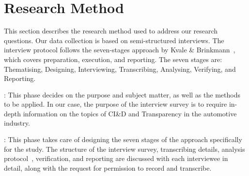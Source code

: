 \section{Research Method}\label{sec:researchMethod}


This section describes the research %
{method} used to address our research questions.
Our data collection is based on semi-structured interviews. 
The interview protocol follows the seven-stages approach by Kvale \& Brinkmann~\cite{Kvale2015Interviews}, which covers preparation, execution, and reporting. The seven stages are: Thematising, Designing, Interviewing, Transcribing, Analysing, Verifying, and Reporting. %



: This phase decides on the purpose and subject matter, as well as the methods to be applied. {In our case,} the purpose of the interview survey is to require in-depth information on the topics of CI\&D %
and %
Transparency in the automotive industry. %

: %
{This phase takes care of designing the seven stages of the approach specifically for the study.} The structure of the interview survey, transcribing details, analysis protocol~\cite{saldana2015coding}, verification, and reporting are discussed %
with each interviewee %
in detail, %
along with the request for permission to record and transcribe. %

